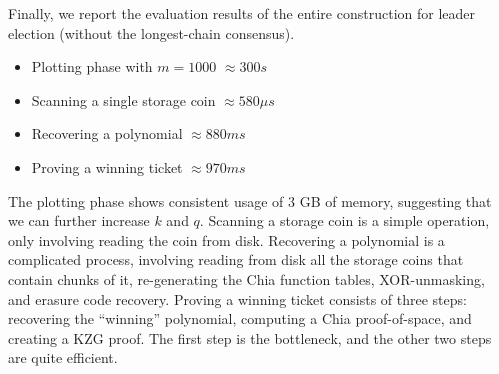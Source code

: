 \documentclass[conference]{IEEEtran}
\begin{document}
Finally, we report the evaluation results of the entire construction for leader election (without the longest-chain consensus).
\begin{itemize}
    \item Plotting phase with $m = 1000$ $\approx 300 s$
    \item Scanning a single storage coin $\approx 580 \mu s$
    \item Recovering a polynomial $\approx 880 ms$
    \item Proving a winning ticket $\approx 970 ms$
\end{itemize}
The plotting phase shows consistent usage of 3 GB of memory, suggesting that we can further increase $k$ and $q$.
Scanning a storage coin is a simple operation, only involving reading the coin from disk.
Recovering a polynomial is a complicated process, involving reading from disk all the storage coins that contain chunks of it, re-generating the Chia function tables,  XOR-unmasking, and erasure code recovery.
Proving a winning ticket consists of three steps: recovering the ``winning'' polynomial, computing a Chia proof-of-space, and creating a KZG proof. The first step is the bottleneck, and the other two steps are quite efficient.
\end{document}
